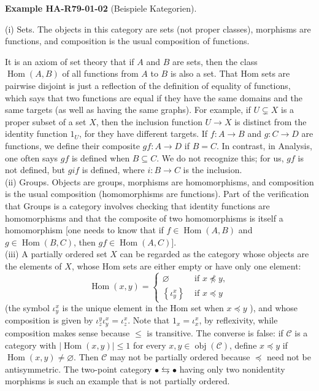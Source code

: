 \documentclass[10pt, letterpaper]{article}
\newcommand{\CustomHeading}[3]{%
  \par\medskip\noindent%
  \textbf{#1 #2} \textnormal{(#3)}.\enskip%
}
\newenvironment{EXA}[2]{\begin{unitbox}\CustomHeading{Example}{#1}{#2}}{\end{unitbox}}
\begin{document}
\begin{EXA}{HA-R79-01-02}{Beispiele Kategorien}
(i) Sets. The objects in this category are sets (not proper classes), morphisms are functions, and composition is the usual composition of functions.

It is an axiom of set theory that if $A$ and $B$ are sets, then the class $\operatorname{Hom}(A, B)$ of all functions from $A$ to $B$ is also a set. That Hom sets are pairwise disjoint is just a reflection of the definition of equality of functions, which says that two functions are equal if they have the same domains and the same targets (as well as having the same graphs). For example, if $U \subsetneq X$ is a proper subset of a set $X$, then the inclusion function $U \rightarrow X$ is distinct from the identity function $1_{U}$, for they have different targets. If $f: A \rightarrow B$ and $g: C \rightarrow D$ are functions, we define their composite $g f: A \rightarrow D$ if $B=C$. In contrast, in Analysis, one often says $g f$ is defined when $B \subseteq C$. We do not recognize this; for us, $g f$ is not defined, but $g i f$ is defined, where $i: B \rightarrow C$ is the inclusion.\\

(ii) Groups. Objects are groups, morphisms are homomorphisms, and composition is the usual composition (homomorphisms are functions). Part of the verification that Groups is a category involves checking that identity functions are homomorphisms and that the composite of two homomorphisms is itself a homomorphism [one needs to know that if $f \in \operatorname{Hom}(A, B)$ and $g \in \operatorname{Hom}(B, C)$, then $g f \in \operatorname{Hom}(A, C)]$.\\

(iii) A partially ordered set $X$ can be regarded as the category whose objects are the elements of $X$, whose Hom sets are either empty or have only one element:
$$
\operatorname{Hom}(x, y)= \begin{cases}\varnothing & \text { if } x \npreceq y, \\ \left\{\iota_{y}^{x}\right\} & \text { if } x \preceq y\end{cases}
$$
(the symbol $\iota_{y}^{x}$ is the unique element in the Hom set when $x \preceq y$ ), and whose composition is given by $\iota_{z}^{y} \iota_{y}^{x}=\iota_{z}^{x}$. Note that $1_{x}=\iota_{x}^{x}$, by reflexivity, while composition makes sense because $\leq$ is transitive. The converse is false: if $\mathcal{C}$ is a category with $|\operatorname{Hom}(x, y)| \leq 1$ for every $x, y \in \operatorname{obj}(\mathcal{C})$, define $x \preceq y$ if $\operatorname{Hom}(x, y) \neq \varnothing$. Then $\mathcal{C}$ may not be partially ordered because $\preceq$ need not be antisymmetric. The two-point category $\bullet \leftrightarrows \bullet$ having only two nonidentity morphisms is such an example that is not partially ordered.


\end{EXA}
\end{document}
